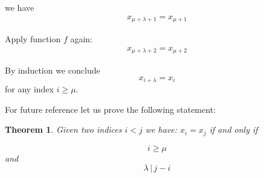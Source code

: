 \documentclass[12pt,a4paper]{article}
\theoremstyle{plain}
\newtheorem{mytheo} {Theorem}
\begin{document}
we have
\begin{gather}
x_{\mu + \lambda + 1} = x_{\mu + 1}
\end{gather}

Apply function $ f $ again:
\begin{gather}
x_{\mu + \lambda + 2} = x_{\mu + 2}
\end{gather}

By induction we conclude
\begin{equation}\label{eq:period}
x_{i + \lambda} = x_{i}
\end{equation}
for any index $ i \geq \mu $.

For future reference let us prove the following statement:

\begin{mytheo}
Given two indices $ i < j $ we have: $ x_i = x_j $ if and only if

\begin{equation}
i \geq \mu
\end{equation}
and
\begin{equation}
\lambda \, | \, j - i
\end{equation}

\end{mytheo}
\end{document}
